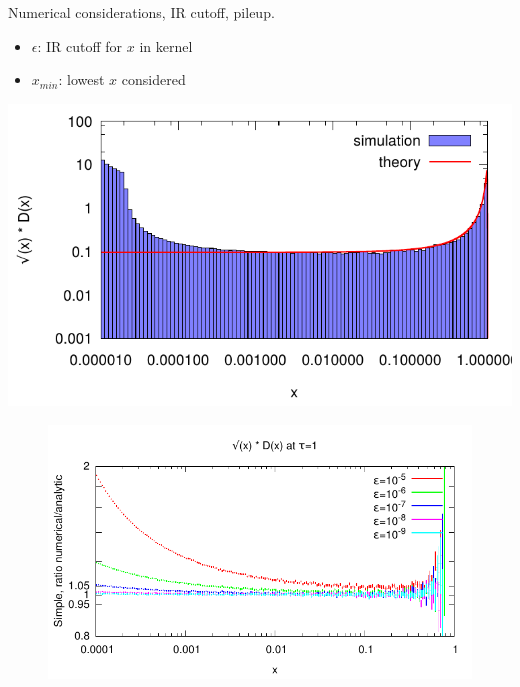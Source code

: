 \documentclass[pstricks,mathserif]{beamer}
\begin{document}
\begin{frame}
Numerical considerations, IR cutoff, pileup.

\begin{itemize}
\item $\epsilon$: IR cutoff for $x$ in kernel
\item $x_{min}$: lowest $x$ considered
\end{itemize}
\endminipage\hfill
{}
\centering
\includegraphics[width=0.8\linewidth]{Dpileup.pdf}
\endminipage\hfill

\begin{figure}
\centering
\includegraphics[width=1\linewidth]{convergence.pdf}
\end{figure}

\end{frame}
\end{document}
